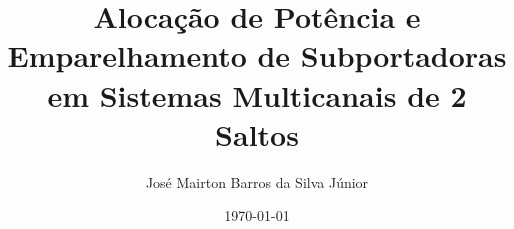 

\title[Trabalho de Conclusão de Curso]{Aloca\c{c}\~{a}o de Pot\^{e}ncia e Emparelhamento de Subportadoras em Sistemas Multicanais de 2 Saltos}
\author{Jos\'{e} Mairton Barros da Silva J\'{u}nior}
\date{\today}



\let\olditem=\item%
\renewcommand{\item}{\olditem \justifying}%

\newcommand{\AtBeginSec}
{
\frame{\tableofcontents[currentsection]}
}

\newenvironment{bigitem}{
\begin{itemize}
  \setlength{\itemsep}{0pt}
  \setlength{\parskip}{2pt}
  \setlength{\parsep}{0pt}
}{\end{itemize}}


\begin{frame}
 \titlepage
\end{frame}













